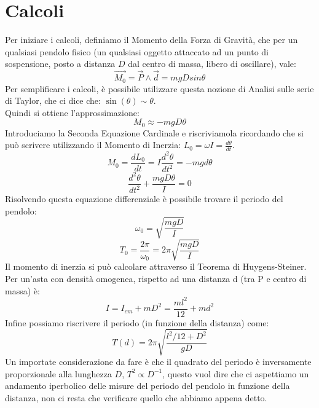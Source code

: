 \documentclass[a4paper]{article}
\begin{document}
    \section{Calcoli}
        Per iniziare i calcoli, definiamo il Momento della Forza di Gravità, che per un qualsiasi pendolo fisico (un qualsiasi oggetto attaccato ad un punto di sospensione, posto a distanza $D$ dal centro di massa, libero di oscillare), vale:
        \begin{equation}\label{eq:1}
            \vec{M_0} = \vec{P} \wedge \vec{d} = m g D sin\theta
        \end{equation}
        Per semplificare i calcoli, è possibile utilizzare questa nozione di Analisi sulle serie di Taylor, che ci dice che: $\sin(\theta) \sim \theta$.\\
        Quindi si ottiene l'approssimazione:
        \begin{equation*}
            M_0 \approx - m g D \theta
        \end{equation*}
        Introduciamo la Seconda Equazione Cardinale e riscriviamola ricordando che  si può scrivere utilizzando il Momento di Inerzia: $L_0 = \omega I = \frac{d\theta}{dt}$.
        \begin{equation*}
            M_0 = \frac{dL_0}{dt} = I \frac{d^2\theta}{dt^2} = - m g d \theta
        \end{equation*}
        \begin{equation*}
            \frac{d^2\theta}{dt^2} + \frac{m g D \theta}{I} = 0
        \end{equation*}
        Risolvendo questa equazione differenziale è possibile trovare il periodo del pendolo:
        \begin{equation*}
            \omega_0 = \sqrt{\frac{mgD}{I}}
        \end{equation*}
        \begin{equation*}
            T_0 = \frac{2\pi}{\omega_0} = 2\pi \sqrt{\frac{mgD}{I}}
        \end{equation*}
        Il momento di inerzia si può calcolare attraverso il Teorema di Huygens-Steiner. Per un'asta con densità omogenea, rispetto ad una distanza d (tra P e centro di massa) è:
        \begin{equation*}
            I = I_{cm} + m D^2 = \frac{ml^2}{12} + md^2
        \end{equation*}
        Infine possiamo riscrivere il periodo (in funzione della distanza) come:
        \begin{equation}
            T(d) = 2\pi \sqrt{\frac{l^2/12 + D^2}{gD}}
        \end{equation}
        Un importate considerazione da fare è che il quadrato del periodo è inversamente proporzionale alla lunghezza $D$, $ T^2 \propto D^{-1}$, questo vuol dire che ci aspettiamo un andamento iperbolico delle misure del periodo del pendolo in funzione della distanza, non ci resta che verificare quello che abbiamo appena detto.
        
\end{document}
